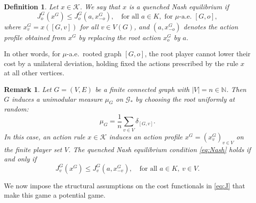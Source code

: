 \documentclass[11pt]{article}
\newcommand{\N}{{\mathbb N}}
\newcommand{\be}{\begin{equation}}
\newcommand{\ee}{\end{equation}}
\newtheorem{remark}[theorem]{Remark}
\newtheorem{definition}[theorem]{Definition}
\numberwithin{equation}{section}
\begin{document}
\begin{definition}
Let \(x\in \mathcal K\). We say that \(x\) is a quenched Nash equilibrium if
\begin{equation} \label{eq:Nash}
J_o^G(x^G)\le J_o^G(a,x^G_{-o}),\quad \text{for all } a\in K,\text{ for } \mu\text{-a.e. } [G,o],
\end{equation}
where \(x^G_v=x([G,v])\) for all \(v\in V(G)\), and \((a,x^G_{-o})\) denotes the action profile obtained from \(x^G\) by replacing the root action $x^G_o$ by $a$.
\end{definition}
In other words, for $\mu$-a.e.~rooted graph $[G,o]$, the root player cannot lower their cost by a unilateral deviation, holding fixed the actions prescribed by the rule $x$ at all other vertices.

\begin{remark} Let \(G=(V,E)\) be a finite connected graph with \(|V|=n\in\N\). Then \(G\) induces a unimodular measure \(\mu_G\) on \(\mathcal G_\ast\) by choosing the root uniformly at random:
\be\label{eq:muG}
\mu_G = \frac{1}{n} \sum_{v\in V} \delta_{[G,v]}.
\ee
In this case, an action rule \(x\in \mathcal K\) induces an action profile \(x^G=(x_v^G)_{v\in V}\) on the finite player set \(V\). The quenched Nash equilibrium condition
\eqref{eq:Nash} holds if and only if
\[
J_v^G(x^G)\le J_v^G(a,x^G_{-v}),
\quad \text{for all } a\in K,\ v\in V.
\]
\end{remark}

We now impose the structural assumptions on the cost functionals in \eqref{eq:J} that make this game a potential game.
\end{document}
